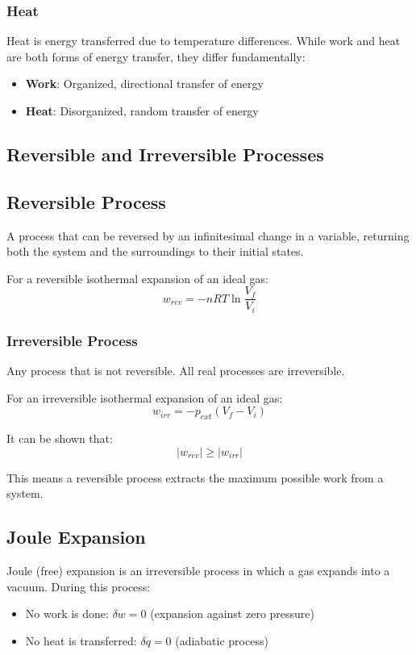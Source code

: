 \documentclass{article}
\theoremstyle{definition}
\begin{document}
\subsubsection{Heat}
Heat is energy transferred due to temperature differences. While work and heat are both forms of energy transfer, they differ fundamentally:
\begin{itemize}
    \item \textbf{Work}: Organized, directional transfer of energy
    \item \textbf{Heat}: Disorganized, random transfer of energy
\end{itemize}

\subsection{Reversible and Irreversible Processes}

\subsection{Reversible Process}
A process that can be reversed by an infinitesimal change in a variable, returning both the system and the surroundings to their initial states.

For a reversible isothermal expansion of an ideal gas:
\[
w_{rev} = -nRT\ln\frac{V_f}{V_i}
\]

\subsubsection{Irreversible Process}
Any process that is not reversible. All real processes are irreversible.

For an irreversible isothermal expansion of an ideal gas:
\[
w_{irr} = -p_{ext}(V_f - V_i)
\]

It can be shown that:
\[
|w_{rev}| \geq |w_{irr}|
\]

This means a reversible process extracts the maximum possible work from a system.

\subsection{Joule Expansion}

Joule (free) expansion is an irreversible process in which a gas expands into a vacuum. During this process:
\begin{itemize}
    \item No work is done: $\delta w = 0$ (expansion against zero pressure)
    \item No heat is transferred: $\delta q = 0$ (adiabatic process)
\end{itemize}
\end{document}
